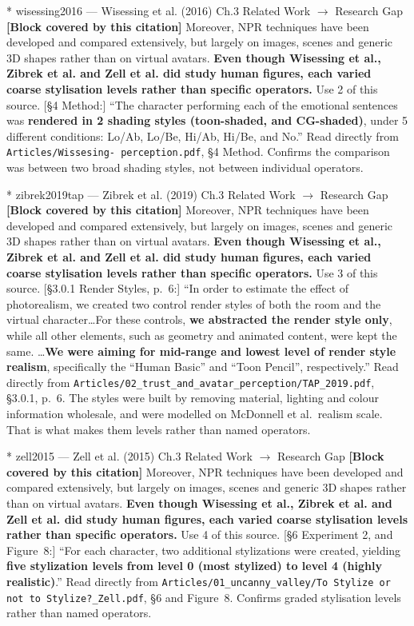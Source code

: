 \documentclass[11pt, a4paper]{article}
\makeatletter
\newcounter{citentry}
\newcommand{\citentry@core}[7]{%
  \stepcounter{citentry}
  \begingroup
  \sbox{\citentry@measurebox}{%
    \begin{minipage}{\linewidth}
      \noindent\colorbox{konstanzblue}{\parbox{\dimexpr\linewidth-2\fboxsep}{%
        \vspace{3pt}
        \textbf{\#\thecitentry \quad #2} \hfill \textit{#3}
        \vspace{3pt}
      }}
      \vspace{3pt}
      \noindent\begin{tabular}{@{}p{2.7cm} p{\dimexpr\linewidth-3cm}@{}}
        \textit{\small Sentence in thesis:} & #4 \\[5pt]
        \textbf{Usage:}\hfill       & #5 \\[5pt]
        \textit{\small Original source:}     & #6 \\[5pt]
        \textbf{How to check:}             & #7 \\
      \end{tabular}
      \vspace{5pt}
      \rule{10pt}{10pt}\quad \textbf{Validated} --- I have read the original and agree it supports the sentence.
    \end{minipage}%
  }%
  \Needspace{\dimexpr\ht\citentry@measurebox+\dp\citentry@measurebox\relax}%
  \endgroup
  \vspace{10pt}
  \noindent\colorbox{konstanzblue}{\parbox{\dimexpr\linewidth-2\fboxsep}{%
    \vspace{3pt}
    \textcolor{white}{\textbf{\#\thecitentry \quad #2}} \hfill \textcolor{white}{\textit{#3}}
    \vspace{3pt}
  }}
  \vspace{3pt}
  \noindent\begin{tabular}{@{}p{2.7cm} p{\dimexpr\linewidth-3cm}@{}}
    \textit{\small Sentence in thesis:} & \textcolor{darkgreen}{#4} \\[5pt]
    \textbf{Usage:}\hfill       & #5 \\[5pt]
    \textit{\small Original source:}     & \textcolor{darkred}{#6} \\[5pt]
    \textbf{How to check:}             & #7 \\
  \end{tabular}
  \vspace{5pt}
  \noindent\CheckBox[name=verified\thecitentry, width=10pt, height=10pt, bordercolor={0 0 0}, borderwidth=0.75, backgroundcolor={1 1 1}#1]{}\quad \textbf{Validated} --- I have read the original and agree it supports the sentence.
  \vspace{3pt}
  \noindent\textcolor{midgray}{\rule{\linewidth}{0.4pt}}
}
\newcommand{\citentry}{\@ifstar{\citentry@core{, checked}}{\citentry@core{}}}
\makeatother
\begin{document}
\begin{Form}
\citentry*
  {wisessing2016 --- Wisessing et al. (2016)}
  {Ch.3 Related Work $\rightarrow$ Research Gap}
  {\textbf{[Block covered by this citation]} Moreover, NPR techniques have been developed and compared extensively, but largely on images, scenes and generic 3D shapes rather than on virtual avatars. \textbf{Even though Wisessing et al., Zibrek et al. and Zell et al. did study human figures, each varied coarse stylisation levels rather than specific operators.}}
  {Use 2 of this source.}
  {[\S4 Method:] ``The character performing each of the emotional sentences was \textbf{rendered in 2 shading styles (toon-shaded, and CG-shaded)}, under 5 different conditions: Lo/Ab, Lo/Be, Hi/Ab, Hi/Be, and No.''}
  {Read directly from \texttt{\footnotesize Articles/Wissesing- perception.pdf}, \S4 Method. Confirms the comparison was between two broad shading styles, not between individual operators.}

\citentry*
  {zibrek2019tap --- Zibrek et al. (2019)}
  {Ch.3 Related Work $\rightarrow$ Research Gap}
  {\textbf{[Block covered by this citation]} Moreover, NPR techniques have been developed and compared extensively, but largely on images, scenes and generic 3D shapes rather than on virtual avatars. \textbf{Even though Wisessing et al., Zibrek et al. and Zell et al. did study human figures, each varied coarse stylisation levels rather than specific operators.}}
  {Use 3 of this source.}
  {[\S3.0.1 Render Styles, p.~6:] ``In order to estimate the effect of photorealism, we created two control render styles of both the room and the virtual character\ldots For these controls, \textbf{we abstracted the render style only}, while all other elements, such as geometry and animated content, were kept the same. \ldots \textbf{We were aiming for mid-range and lowest level of render style realism}, specifically the ``Human Basic'' and ``Toon Pencil'', respectively.''}
  {Read directly from \texttt{\footnotesize Articles/02\_trust\_and\_avatar\_perception/TAP\_2019.pdf}, \S3.0.1, p.~6. The styles were built by removing material, lighting and colour information wholesale, and were modelled on McDonnell et al.\ realism scale. That is what makes them levels rather than named operators.}

\citentry*
  {zell2015 --- Zell et al. (2015)}
  {Ch.3 Related Work $\rightarrow$ Research Gap}
  {\textbf{[Block covered by this citation]} Moreover, NPR techniques have been developed and compared extensively, but largely on images, scenes and generic 3D shapes rather than on virtual avatars. \textbf{Even though Wisessing et al., Zibrek et al. and Zell et al. did study human figures, each varied coarse stylisation levels rather than specific operators.}}
  {Use 4 of this source.}
  {[\S6 Experiment 2, and Figure~8:] ``For each character, two additional stylizations were created, yielding \textbf{five stylization levels from level 0 (most stylized) to level 4 (highly realistic)}.''}
  {Read directly from \texttt{\footnotesize Articles/01\_uncanny\_valley/To Stylize or not to Stylize?\_Zell.pdf}, \S6 and Figure~8. Confirms graded stylisation levels rather than named operators.}


\end{Form}
\end{document}
